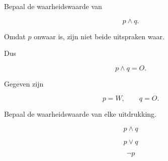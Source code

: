 \documentclass{ximera}
\begin{document}
\begin{oefening}[Of: de disjunctie]{\oefB \ESS}
\begin{question}
Bepaal de waarheidswaarde van

\[
p\land q.
\]

\begin{oplossing}

Omdat $p$ onwaar is, zijn niet beide uitspraken waar.

Dus

\[
p\land q=O.
\]

\end{oplossing}

\end{question}

\end{oefening}





\begin{oefening}{\oefB \ESS}

Gegeven zijn

\[
p=W,
\qquad
q=O.
\]

Bepaal de waarheidswaarde van elke uitdrukking.

\begin{question}

\[
p\land q
\]

\begin{multipleChoice}



\end{multipleChoice}

\end{question}



\begin{question}

\[
p\lor q
\]

\begin{multipleChoice}



\end{multipleChoice}

\end{question}



\begin{question}

\[
\neg p
\]

\begin{multipleChoice}


\end{multipleChoice}
\end{question}
\end{oefening}
\end{document}
